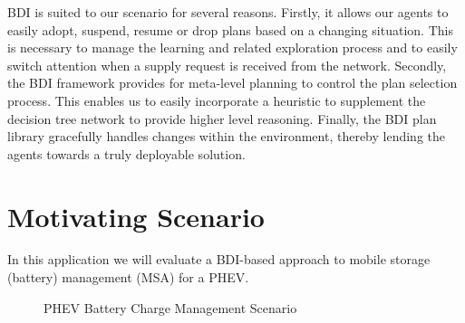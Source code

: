 \documentclass[a4paper]{article}
\begin{document}
BDI is suited to our scenario for several reasons. Firstly, it allows our agents to easily adopt, suspend, resume or drop plans based on a changing situation. This is necessary to manage the learning and related exploration process and to easily switch attention when a supply request is received from the network. Secondly, the BDI framework provides for meta-level planning to control the plan selection process. This enables us to easily incorporate a heuristic to supplement the decision tree network to provide higher level reasoning. Finally, the BDI plan library gracefully handles changes within the environment, thereby lending the agents towards a truly deployable solution.

\section{Motivating Scenario}

In this application we will evaluate a BDI-based approach to mobile storage (battery) management (MSA) for a PHEV. 


\begin{figure}[htbp]
\begin{center}
\fbox{

}
\end{center}
\caption{PHEV Battery Charge Management Scenario}
\label{fig:scenario}
\end{figure}
\end{document}
